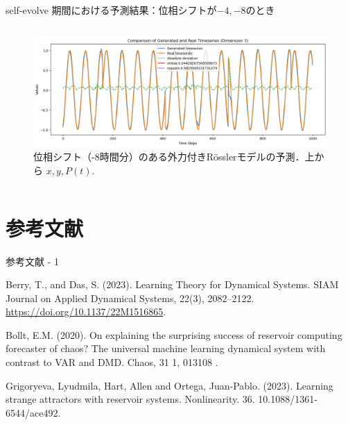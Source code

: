 \begin{frame}{self-evolve 期間における予測結果：位相シフトが$-4, -8$のとき}
\begin{columns}[T]
\begin{column}{.5\textwidth}
\begin{figure}
          \vspace{.5em}
          \begin{minipage}[c][.27\textheight][c]{\linewidth}
            \centering
            \includegraphics[width=0.7\linewidth]{Fig/-8.p.png}
            \caption{\scriptsize{位相シフト（-8時間分）のある外力付きRösslerモデルの予測．上から $x, y, P(t)$.}}
          \end{minipage}
        \end{figure}
      \end{column}
    \end{columns}
  \end{frame}
  
  



\section{参考文献}

\begin{frame}{参考文献 - 1}
    \begin{thebibliography}{99}    
        Berry, T., and Das, S. (2023). Learning Theory for Dynamical Systems. SIAM Journal on Applied Dynamical Systems, 22(3), 2082–2122. \url{https://doi.org/10.1137/22M1516865}.
  
      
        Bollt, E.M. (2020). On explaining the surprising success of reservoir computing forecaster of chaos? The universal machine learning dynamical system with contrast to VAR and DMD. Chaos, 31 1, 013108 .

        
        
        Grigoryeva, Lyudmila, Hart, Allen and Ortega, Juan-Pablo. (2023). Learning strange attractors with reservoir systems. Nonlinearity. 36. 10.1088/1361-6544/ace492.
    \end{thebibliography}
\end{frame}

